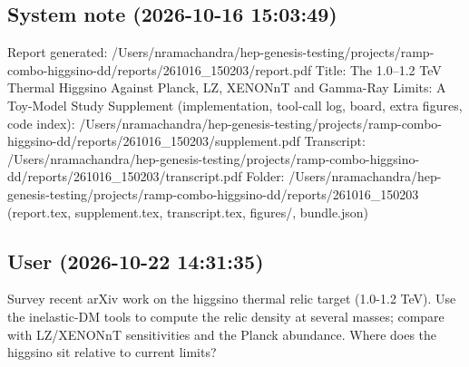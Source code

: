 \documentclass[11pt,a4paper]{article}
\begin{document}
\subsection*{System note \small(2026-10-16 15:03:49)}
Report generated: /Users/nramachandra/hep-genesis-testing/projects/ramp-combo-higgsino-dd/reports/261016\_150203/report.pdf Title: The 1.0--1.2 TeV Thermal Higgsino Against Planck, LZ, XENONnT and Gamma-Ray Limits: A Toy-Model Study Supplement (implementation, tool-call log, board, extra figures, code index): /Users/nramachandra/hep-genesis-testing/projects/ramp-combo-higgsino-dd/reports/261016\_150203/supplement.pdf Transcript: /Users/nramachandra/hep-genesis-testing/projects/ramp-combo-higgsino-dd/reports/261016\_150203/transcript.pdf Folder: /Users/nramachandra/hep-genesis-testing/projects/ramp-combo-higgsino-dd/reports/261016\_150203 (report.tex, supplement.tex, transcript.tex, figures/, bundle.json)

\subsection*{User \small(2026-10-22 14:31:35)}
Survey recent arXiv work on the higgsino thermal relic target (1.0-1.2 TeV). Use the inelastic-DM tools to compute the relic density at several masses; compare with LZ/XENONnT sensitivities and the Planck abundance. Where does the higgsino sit relative to current limits?
\end{document}
